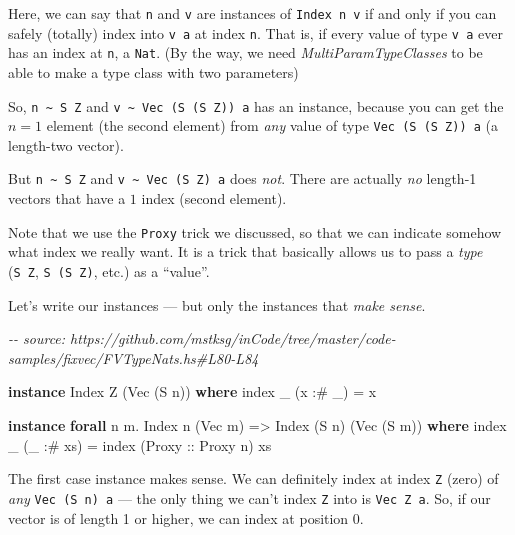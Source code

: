 \documentclass[]{article}
\newenvironment{Shaded}{}{}
\newcommand{\CommentTok}[1]{\textcolor[rgb]{0.38,0.63,0.69}{\textit{#1}}}
\newcommand{\DataTypeTok}[1]{\textcolor[rgb]{0.56,0.13,0.00}{#1}}
\newcommand{\FunctionTok}[1]{\textcolor[rgb]{0.02,0.16,0.49}{#1}}
\newcommand{\KeywordTok}[1]{\textcolor[rgb]{0.00,0.44,0.13}{\textbf{#1}}}
\newcommand{\NormalTok}[1]{#1}
\newcommand{\OperatorTok}[1]{\textcolor[rgb]{0.40,0.40,0.40}{#1}}
\newcommand{\OtherTok}[1]{\textcolor[rgb]{0.00,0.44,0.13}{#1}}
\begin{document}
Here, we can say that \texttt{n} and \texttt{v} are instances of
\texttt{Index\ n\ v} if and only if you can safely (totally) index into
\texttt{v\ a} at index \texttt{n}. That is, if every value of type \texttt{v\ a}
ever has an index at \texttt{n}, a \texttt{Nat}. (By the way, we need
\emph{MultiParamTypeClasses} to be able to make a type class with two
parameters)

So, \texttt{n\ \textasciitilde{}\ S\ Z} and
\texttt{v\ \textasciitilde{}\ Vec\ (S\ (S\ Z))\ a} has an instance, because you
can get the \(n = 1\) element (the second element) from \emph{any} value of type
\texttt{Vec\ (S\ (S\ Z))\ a} (a length-two vector).

But \texttt{n\ \textasciitilde{}\ S\ Z} and
\texttt{v\ \textasciitilde{}\ Vec\ (S\ Z)\ a} does \emph{not}. There are
actually \emph{no} length-1 vectors that have a \(1\) index (second element).

Note that we use the \texttt{Proxy} trick we discussed, so that we can indicate
somehow what index we really want. It is a trick that basically allows us to
pass a \emph{type} (\texttt{S\ Z}, \texttt{S\ (S\ Z)}, etc.) as a ``value''.

Let's write our instances --- but only the instances that \emph{make sense}.

\begin{Shaded}
\begin{Highlighting}[]
\CommentTok{{-}{-} source: https://github.com/mstksg/inCode/tree/master/code{-}samples/fixvec/FVTypeNats.hs\#L80{-}L84}

\KeywordTok{instance} \DataTypeTok{Index} \DataTypeTok{Z}\NormalTok{ (}\DataTypeTok{Vec}\NormalTok{ (}\DataTypeTok{S}\NormalTok{ n)) }\KeywordTok{where}
    \FunctionTok{index}\NormalTok{ \_ (x }\OperatorTok{:\#}\NormalTok{ \_) }\OtherTok{=}\NormalTok{ x}

\KeywordTok{instance} \KeywordTok{forall}\NormalTok{ n m}\OperatorTok{.} \DataTypeTok{Index}\NormalTok{ n (}\DataTypeTok{Vec}\NormalTok{ m) }\OtherTok{=>} \DataTypeTok{Index}\NormalTok{ (}\DataTypeTok{S}\NormalTok{ n) (}\DataTypeTok{Vec}\NormalTok{ (}\DataTypeTok{S}\NormalTok{ m)) }\KeywordTok{where}
    \FunctionTok{index}\NormalTok{ \_ (\_ }\OperatorTok{:\#}\NormalTok{ xs) }\OtherTok{=} \FunctionTok{index}\NormalTok{ (}\DataTypeTok{Proxy}\OtherTok{ ::} \DataTypeTok{Proxy}\NormalTok{ n) xs}
\end{Highlighting}
\end{Shaded}

The first case instance makes sense. We can definitely index at index \texttt{Z}
(zero) of \emph{any} \texttt{Vec\ (S\ n)\ a} --- the only thing we can't index
\texttt{Z} into is \texttt{Vec\ Z\ a}. So, if our vector is of length 1 or
higher, we can index at position 0.
\end{document}
